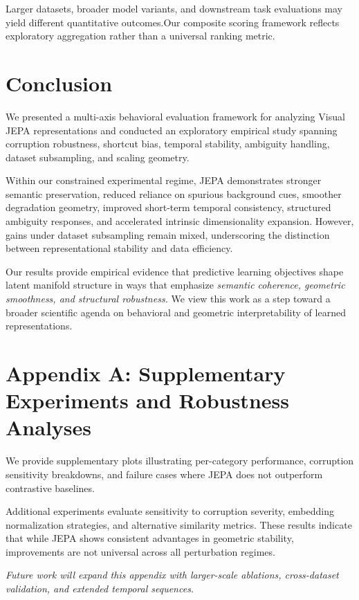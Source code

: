 \documentclass[10pt,twocolumn]{article}
\begin{document}
Larger datasets, broader model variants, and downstream task evaluations may yield different quantitative outcomes.Our composite scoring framework reflects exploratory aggregation rather than a universal ranking metric.

\section{Conclusion}
We presented a multi-axis behavioral evaluation framework for analyzing Visual JEPA representations and conducted an exploratory empirical study spanning corruption robustness, shortcut bias, temporal stability, ambiguity handling, dataset subsampling, and scaling geometry.

Within our constrained experimental regime, JEPA demonstrates stronger semantic preservation, reduced reliance on spurious background cues, smoother degradation geometry, improved short-term temporal consistency, structured ambiguity responses, and accelerated intrinsic dimensionality expansion. However, gains under dataset subsampling remain mixed, underscoring the distinction between representational stability and data efficiency.

Our results provide empirical evidence that predictive learning objectives shape latent manifold structure in ways that emphasize \textit{semantic coherence, geometric smoothness, and structural robustness.} We view this work as a step toward a broader scientific agenda on behavioral and geometric interpretability of learned representations.

\section{Appendix A: Supplementary Experiments and Robustness Analyses}
We provide supplementary plots illustrating per-category performance, corruption sensitivity breakdowns, and failure cases where JEPA does not outperform contrastive baselines.

Additional experiments evaluate sensitivity to corruption severity, embedding normalization strategies, and alternative similarity metrics. These results indicate that while JEPA shows consistent advantages in geometric stability, improvements are not universal across all perturbation regimes.

\textit{Future work will expand this appendix with larger-scale ablations, cross-dataset validation, and extended temporal sequences.}
\end{document}
